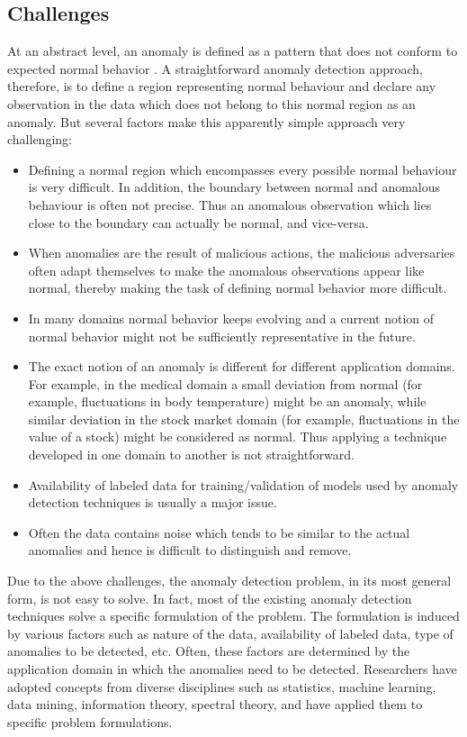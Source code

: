 \subsection{Challenges}
\label{sec:anomalyDetectionChallenges}
At an abstract level, an anomaly is defined as a pattern that does not conform 
to expected normal behavior \cite{Chandola:2007}. A straightforward anomaly 
detection approach, therefore, is to define a region representing normal 
behaviour and declare any observation in the data which does not belong to this 
normal region as an anomaly. But several factors make this apparently simple 
approach very challenging:

\begin{itemize}
\item Defining a normal region which encompasses every possible normal behaviour 
is very difficult. In addition, the boundary between normal and anomalous 
behaviour is often not precise. Thus an anomalous observation which lies close
to the boundary can actually be normal, and vice-versa.
\item When anomalies are the result of malicious actions, the malicious 
adversaries often adapt themselves to make the anomalous observations appear 
like normal, thereby making the task of defining normal behavior more difficult.
\item In many domains normal behavior keeps evolving and a current notion of
normal behavior might not be sufficiently representative in the future.
\item The exact notion of an anomaly is different for different application 
domains. For example, in the medical domain a small deviation from normal (for
example, fluctuations in body temperature) might be an anomaly, while similar 
deviation in the stock market domain (for example, fluctuations in the value of 
a stock) might be considered as normal. Thus applying a technique developed in 
one domain to another is not straightforward.
\item Availability of labeled data for training/validation of models used by 
anomaly detection techniques is usually a major issue.
\item Often the data contains noise which tends to be similar to the actual 
anomalies and hence is difficult to distinguish and remove.
\end{itemize}

Due to the above challenges, the anomaly detection problem, in its most general
form, is not easy to solve. In fact, most of the existing anomaly detection 
techniques solve a specific formulation of the problem. The formulation is 
induced by various factors such as nature of the data, availability of labeled 
data, type of anomalies to be detected, etc. Often, these factors are determined
by the application domain in which the anomalies need to be detected. 
Researchers have adopted concepts from diverse disciplines such as statistics, 
machine learning, data mining, information theory, spectral theory, and have 
applied them to specific problem formulations.

